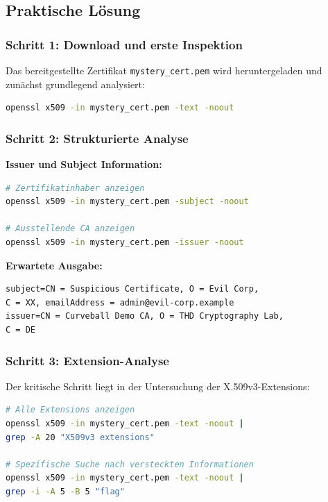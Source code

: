 \documentclass{article}
\begin{document}
\subsection{Praktische Lösung}

\subsubsection{Schritt 1: Download und erste Inspektion}
Das bereitgestellte Zertifikat \texttt{mystery\_cert.pem} wird heruntergeladen und zunächst grundlegend analysiert:

\begin{lstlisting}[language=bash,caption={Grundlegende Zertifikatsinformationen}]
openssl x509 -in mystery_cert.pem -text -noout
\end{lstlisting}

\subsubsection{Schritt 2: Strukturierte Analyse}

\textbf{Issuer und Subject Information:}
\begin{lstlisting}[language=bash]
# Zertifikatinhaber anzeigen
openssl x509 -in mystery_cert.pem -subject -noout

# Ausstellende CA anzeigen  
openssl x509 -in mystery_cert.pem -issuer -noout
\end{lstlisting}

\textbf{Erwartete Ausgabe:}
\begin{lstlisting}
subject=CN = Suspicious Certificate, O = Evil Corp, 
C = XX, emailAddress = admin@evil-corp.example
issuer=CN = Curveball Demo CA, O = THD Cryptography Lab, 
C = DE
\end{lstlisting}

\subsubsection{Schritt 3: Extension-Analyse}
Der kritische Schritt liegt in der Untersuchung der X.509v3-Extensions:

\begin{lstlisting}[language=bash]
# Alle Extensions anzeigen
openssl x509 -in mystery_cert.pem -text -noout | 
grep -A 20 "X509v3 extensions"

# Spezifische Suche nach versteckten Informationen
openssl x509 -in mystery_cert.pem -text -noout | 
grep -i -A 5 -B 5 "flag"
\end{lstlisting}
\end{document}

